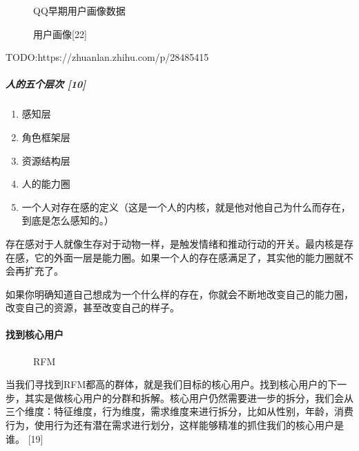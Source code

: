 \documentclass[letterpaper,11pt,english]{sphinxmanual}
\begin{document}
\begin{figure}[H]
\centering
\capstart

\noindent{}
\caption{QQ早期用户画像数据}\label{\detokenize{chapter_knowledge/users_analysis:id36}}\end{figure}

\begin{figure}[H]
\centering
\capstart

\noindent{}
\caption{用户画像{[}22{]}}\label{\detokenize{chapter_knowledge/users_analysis:id37}}\end{figure}

TODO:https://zhuanlan.zhihu.com/p/28485415


\subparagraph{人的五个层次 {[}10{]}}
\label{\detokenize{chapter_knowledge/users_analysis:id13}}\begin{enumerate}
%
\item {} 
感知层

\item {} 
角色框架层

\item {} 
资源结构层

\item {} 
人的能力圈

\item {} 
一个人对存在感的定义（这是一个人的内核，就是他对他自己为什么而存在，到底是怎么感知的。）

\end{enumerate}

存在感对于人就像生存对于动物一样，是触发情绪和推动行动的开关。最内核是存在感，它的外面一层是能力圈。如果一个人的存在感满足了，其实他的能力圈就不会再扩充了。

如果你明确知道自己想成为一个什么样的存在，你就会不断地改变自己的能力圈，改变自己的资源，甚至改变自己的样子。


\paragraph{找到核心用户}
\label{\detokenize{chapter_knowledge/users_analysis:id14}}
\begin{figure}[H]
\centering
\capstart

\noindent{}
\caption{RFM}\label{\detokenize{chapter_knowledge/users_analysis:id38}}\end{figure}

当我们寻找到RFM都高的群体，就是我们目标的核心用户。找到核心用户的下一步，其实是做核心用户的分群和拆解。核心用户仍然需要进一步的拆分，我们会从三个维度：特征维度，行为维度，需求维度来进行拆分，比如从性别，年龄，消费行为，使用行为还有潜在需求进行划分，这样能够精准的抓住我们的核心用户是谁。
{[}19{]}
\end{document}

